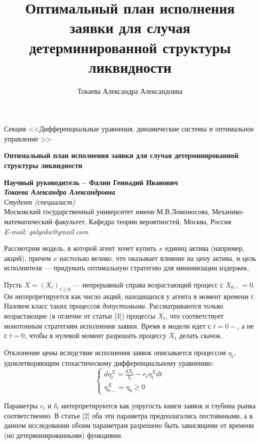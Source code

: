 \documentclass[a4paper, 12pt, oneside]{ncc}
\title{ Оптимальный план исполнения заявки для случая детерминированной структуры ликвидности }
\author{ Токаева Александра Александовна }
\begin{document}
\begin{flushright}
Секция <<Дифференциальные уравнения, динамические системы и оптимальное управление >>
\end{flushright}

\begin{center}
\textbf{Оптимальный план исполнения заявки для случая детерминированной структуры ликвидности}
\end{center}

\begin{center}
\textbf{Научный руководитель -- Фалин Геннадий Иванович  }\\
\vspace{0.2cm}
\textbf{\textit{Токаева Александра Александровна}}\\
\textit{Студент (специалист)}\\
Московский государственный университет имени М.В.Ломоносова, Механико-математический факультет, Кафедра теории вероятностей, Москва, Россия\\
\textit{E-mail: galynka@ymail.com}
\\
\end{center}

Рассмотрим модель, в которой агент хочет купить $x$ единиц актива (например, акций), причем $x$ настолько велико, что оказывает влияние на цену актива, и цель исполнителя — придумать оптимальную стратегию для минимизации издержек.

Пусть $X=\left( X_{t} \right)_{t\geq0}$ — непрерывный справа возрастающий процесс с $X_{0-}=0$. 
Он интерпретируется как число акций, находящихся у агента в момент времени $t$. Назовем класс таких процессов {\em допустимыми.} Рассматриваются только возрастающие (в отличие от статьи [3]) процессы $X_t$, что соответствует монотонным стратегиям исполнения заявки. Время в модели идет с $t=0-$, а не с $t=0$, чтобы в нулевой момент разрешать процессу $X_t$ делать скачок.


Отклонение цены вследствие исполнения заявок описывается процессом $\eta_t$, удовлетворяющим стохастическому дифференциальному уравнению:
$$
\begin{cases}
d\eta^X_t=\frac{dX_t}{\delta_t} -r_t\eta^X_tdt\\
\eta^X_{0-}=\eta_{0}\geq 0 
\end{cases}
$$

Параметры $r_t$ и $\delta_t$ интерпретируются как упругость книги заявок и глубина рынка соответственно. В статье [2] оба эти параметра предполагались постоянными, а в данном исследовании обоим параметрам разрешено быть зависящими от времени (но детерминированными) функциями. 
\end{document}
